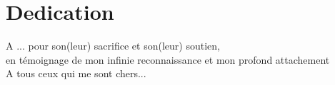 \documentclass[a4paper, oneside, french, 12pt, final]{extreport}
\newcommand{\reportAuthor} {%
  FirstName \textsc{LastName}%
}
\begin{document}



%


	




\chapter*{Dedication}
\thispagestyle{empty}
%

\begin{center}
 {\it 
	
A ... pour son(leur) sacrifice et son(leur) soutien, \\
en témoignage de mon infinie reconnaissance et mon profond attachement \\
\vspace{1cm}
A tous ceux qui me sont chers...

}
\end{center}
%
%
\end{document}
